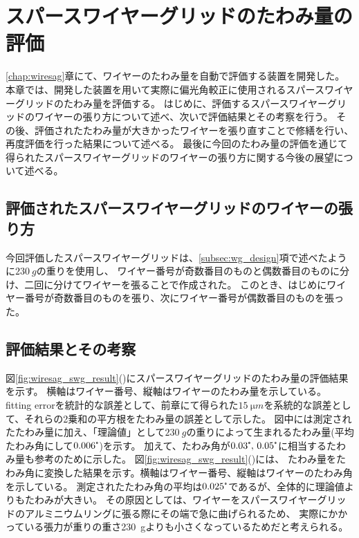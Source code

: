 \documentclass[../../main.tex]{subfiles}
\begin{document}
\chapter{スパースワイヤーグリッドのたわみ量の評価}
\label{chap:wiresag_swg}
\ref{chap:wiresag}章にて、ワイヤーのたわみ量を自動で評価する装置を開発した。
本章では、開発した装置を用いて実際に偏光角較正に使用されるスパースワイヤーグリッドのたわみ量を評価する。
はじめに、評価するスパースワイヤーグリッドのワイヤーの張り方について述べ、次いで評価結果とその考察を行う。
その後、評価されたたわみ量が大きかったワイヤーを張り直すことで修繕を行い、再度評価を行った結果について述べる。
最後に今回のたわみ量の評価を通じて得られたスパースワイヤーグリッドのワイヤーの張り方に関する今後の展望について述べる。

\section{評価されたスパースワイヤーグリッドのワイヤーの張り方}
今回評価したスパースワイヤーグリッドは、\ref{subsec:wg_design}項で述べたように$\SI{230}{g}$の重りを使用し、
ワイヤー番号が奇数番目のものと偶数番目のものに分け、二回に分けてワイヤーを張ることで作成された。
このとき、はじめにワイヤー番号が奇数番目のものを張り、次にワイヤー番号が偶数番目のものを張った。

\section{評価結果とその考察}
図\ref{fig:wiresag_swg_result}()にスパースワイヤーグリッドのたわみ量の評価結果を示す。
横軸はワイヤー番号、縦軸はワイヤーのたわみ量を示している。
fitting errorを統計的な誤差として、前章にて得られた$\SI{15}{\micro m}$を系統的な誤差として、それらの2乗和の平方根をたわみ量の誤差として示した。
図中には測定されたたわみ量に加え、「理論値」として$\SI{230}{g}$の重りによって生まれるたわみ量(平均たわみ角にして$0.006\tcdegree$)を示す。
加えて、たわみ角が$0.03\tcdegree,\,0.05\tcdegree$に相当するたわみ量も参考のために示した。
図\ref{fig:wiresag_swg_result}()には、
たわみ量をたわみ角に変換した結果を示す。横軸はワイヤー番号、縦軸はワイヤーのたわみ角を示している。
測定されたたわみ角の平均は$0.025\tcdegree$であるが、全体的に理論値よりもたわみが大きい。
その原因としては、ワイヤーをスパースワイヤーグリッドのアルミニウムリングに張る際にその端で急に曲げられるため、
実際にかかっている張力が重りの重さ\SI{230}{g}よりも小さくなっているためだと考えられる。
\end{document}
